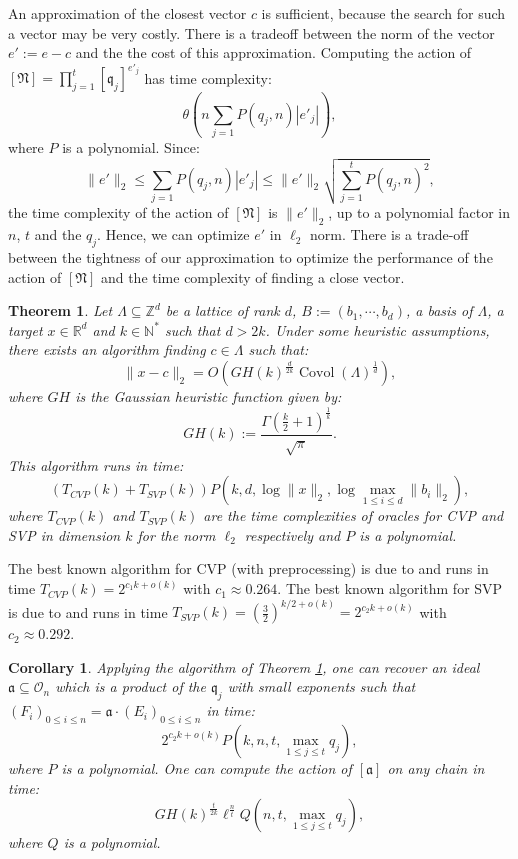 \documentclass[a4paper,10pt]{report}
\theoremstyle{definition}
\theoremstyle{plain}
\newtheorem{Corollary}[Definition]{Corollary}
\newtheorem{Theorem}[Definition]{Theorem}
\theoremstyle{definition}
\newcommand{\N}{\mathbb{N}}
\newcommand{\Z}{\mathbb{Z}}
\newcommand{\R}{\mathbb{R}}
\newcommand{\mO}{\mathcal{O}}
\renewcommand{\(}{\left(}
\renewcommand{\)}{\right)}
\newcommand{\mf}[1]{\mathfrak{#1}}
\DeclareMathOperator{\Covol}{Covol}
\begin{document}
An approximation of the closest vector $c$ is sufficient, because the search for such a vector may be very costly. There is a tradeoff between the norm of the vector $e':=e-c$ and the the cost of this approximation. Computing the action of $[\mf{N}]=\prod_{j=1}^t[\mf{q}_j]^{e'_j}$ has time complexity:
\[\theta\(n\sum_{j=1}P(q_j,n)|e'_j|\),\]
where $P$ is a polynomial. Since:
\[\|e'\|_2\leq \sum_{j=1}P(q_j,n)|e'_j|\leq \|e'\|_2\sqrt{\sum_{j=1}^tP(q_j,n)^2},\]
the time complexity of the action of $[\mf{N}]$ is $\|e'\|_2$, up to a polynomial factor in $n$, $t$ and the $q_j$. Hence, we can optimize $e'$ in $\ell_2$ norm. There is a trade-off between the tightness of our approximation to optimize the performance of  the action of $[\mf{N}]$ and the time complexity of finding a close vector.

\begin{Theorem}\cite[Theorem 3.3]{Espitau2020}\label{Theorem 7}
Let $\Lambda\subseteq\Z^d$ be a lattice of rank $d$, $B:=(b_1,\cdots, b_d)$,  a basis of $\Lambda$, a target $x\in\R^d$ and $k\in\N^*$ such that $d>2k$. Under some heuristic assumptions, there exists an algorithm finding $c\in\Lambda$ such that:
\[\|x-c\|_2=O\(GH(k)^{\frac{d}{2k}}\Covol(\Lambda)^{\frac{1}{d}}\),\]
where $GH$ is the Gaussian heuristic function given by:
\[GH(k):=\frac{\Gamma\(\frac{k}{2}+1\)^{\frac{1}{k}}}{\sqrt{\pi}}.\]
This algorithm runs in time:
\[(T_{CVP}(k)+T_{SVP}(k))P\(k,d,\log\|x\|_2,\log\max_{1\leq i\leq d}\|b_i\|_2\),\]
where $T_{CVP}(k)$ and $T_{SVP}(k)$ are the time complexities of oracles  for CVP and SVP in dimension $k$ for the norm $\ell_2$ respectively and $P$ is a polynomial.
\end{Theorem}

The best known algorithm for CVP (with preprocessing) is due to \cite{Ducas2020} and runs in time $T_{CVP}(k)=2^{c_1 k+o(k)}$ with $c_1\approx 0.264$. The best known algorithm for SVP is due to \cite{Ducas2016} and runs in time $T_{SVP}(k)=\(\frac{3}{2}\)^{k/2+o(k)}=2^{c_2 k+o(k)}$ with $c_2\approx 0.292$.

\begin{Corollary}\label{Corollary 1}
Applying the algorithm of Theorem \ref{Theorem 7}, one can recover an ideal $\mf{a}\subseteq \mO_n$ which is a product of the $\mf{q}_j$ with small exponents such that $(F_i)_{0\leq i\leq n}=\mf{a}\cdot (E_i)_{0\leq i\leq n}$ in time: 
\[2^{c_2k+o(k)}P(k,n,t,\max_{1\leq j\leq t}q_j),\]
where $P$ is a polynomial.  One can compute the action of $[\mf{a}]$ on any chain in time: 
\[GH(k)^{\frac{t}{2k}}\ell^{\frac{n}{t}}Q(n,t,\max_{1\leq j\leq t}q_j),\] 
where $Q$ is a polynomial.
\end{Corollary} 
\end{document}
